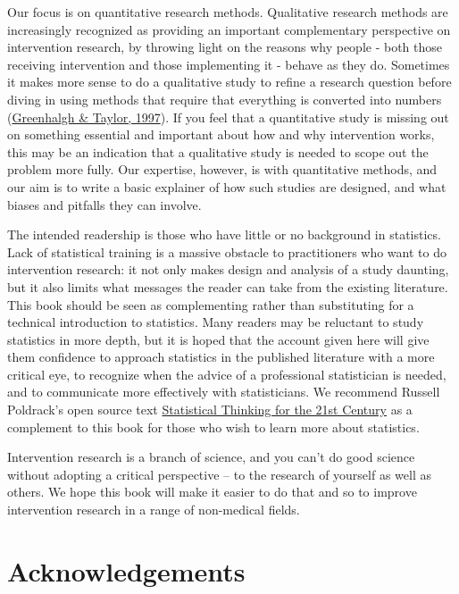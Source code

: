 \documentclass{krantz}
\begin{document}
Our focus is on quantitative research methods. Qualitative research methods are increasingly recognized as providing an important complementary perspective on intervention research, by throwing light on the reasons why people - both those receiving intervention and those implementing it - behave as they do. Sometimes it makes more sense to do a qualitative study to refine a research question before diving in using methods that require that everything is converted into numbers (\protect\hyperlink{ref-greenhalgh1997}{Greenhalgh \& Taylor, 1997}). If you feel that a quantitative study is missing out on something essential and important about how and why intervention works, this may be an indication that a qualitative study is needed to scope out the problem more fully. Our expertise, however, is with quantitative methods, and our aim is to write a basic explainer of how such studies are designed, and what biases and pitfalls they can involve.

The intended readership is those who have little or no background in statistics. Lack of statistical training is a massive obstacle to practitioners who want to do intervention research: it not only makes design and analysis of a study daunting, but it also limits what messages the reader can take from the existing literature. This book should be seen as complementing rather than substituting for a technical introduction to statistics. Many readers may be reluctant to study statistics in more depth, but it is hoped that the account given here will give them confidence to approach statistics in the published literature with a more critical eye, to recognize when the advice of a professional statistician is needed, and to communicate more effectively with statisticians. We recommend Russell Poldrack's open source text \href{https://github.com/statsthinking21/statsthinking21}{Statistical Thinking for the 21st Century} as a complement to this book for those who wish to learn more about statistics.

Intervention research is a branch of science, and you can't do good science without adopting a critical perspective -- to the research of yourself as well as others. We hope this book will make it easier to do that and so to improve intervention research in a range of non-medical fields.

\hypertarget{acknowledgements}{%
\section*{Acknowledgements}\label{acknowledgements}}
\end{document}
